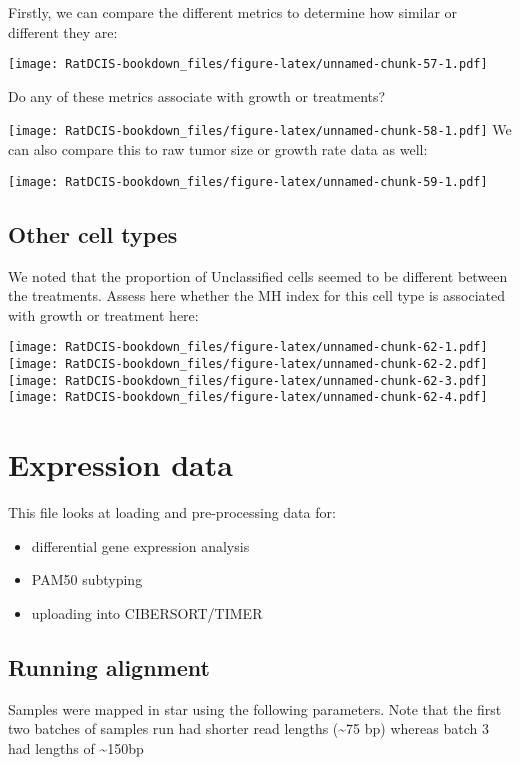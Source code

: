 \documentclass[
]{book}
\providecommand{\tightlist}{%
  \setlength{\itemsep}{0pt}\setlength{\parskip}{0pt}}
\begin{document}
Firstly, we can compare the different metrics to determine how similar or different they are:

\texttt{[image: RatDCIS-bookdown\_files/figure-latex/unnamed-chunk-57-1.pdf]}

Do any of these metrics associate with growth or treatments?

\texttt{[image: RatDCIS-bookdown\_files/figure-latex/unnamed-chunk-58-1.pdf]}
We can also compare this to raw tumor size or growth rate data as well:

\texttt{[image: RatDCIS-bookdown\_files/figure-latex/unnamed-chunk-59-1.pdf]}

\hypertarget{other-cell-types}{%
\section{Other cell types}\label{other-cell-types}}

We noted that the proportion of Unclassified cells seemed to be different between the treatments. Assess here whether the MH index for this cell type is associated with growth or treatment here:

\texttt{[image: RatDCIS-bookdown\_files/figure-latex/unnamed-chunk-62-1.pdf]} \texttt{[image: RatDCIS-bookdown\_files/figure-latex/unnamed-chunk-62-2.pdf]} \texttt{[image: RatDCIS-bookdown\_files/figure-latex/unnamed-chunk-62-3.pdf]} \texttt{[image: RatDCIS-bookdown\_files/figure-latex/unnamed-chunk-62-4.pdf]}

\hypertarget{expression-data}{%
\chapter{Expression data}\label{expression-data}}

This file looks at loading and pre-processing data for:

\begin{itemize}
\tightlist
\item
  differential gene expression analysis
\item
  PAM50 subtyping
\item
  uploading into CIBERSORT/TIMER
\end{itemize}

\hypertarget{running-alignment}{%
\section{Running alignment}\label{running-alignment}}

Samples were mapped in star using the following parameters. Note that the first two batches of samples run had shorter read lengths (\textasciitilde75 bp) whereas batch 3 had lengths of \textasciitilde150bp
\end{document}
